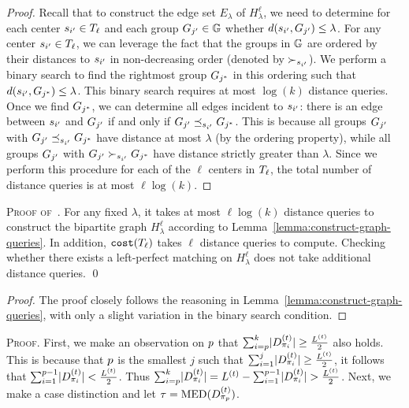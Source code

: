 \documentclass{article}
\begin{document}
\constructgraphqueries*
\begin{proof}
    Recall that to construct the edge set $E_{\lambda}$ of $H^{\ell}_{\lambda}$, we need to determine for each center $s_{i'} \in T_{\ell}$ and each group $G_{j'} \in \mathbb{G}$ whether $d(s_{i'}, G_{j'}) \leq \lambda$.
    For any center $s_{i'} \in T_{\ell}$, we can leverage the fact that the groups in $\mathbb{G}$ are ordered by their distances to $s_{i'}$ in non-decreasing order (denoted by $\succ_{s_{i'}}$). 
    We perform a binary search to find the rightmost group $G_{j^*}$ in this ordering such that $d(s_{i'}, G_{j^*}) \leq \lambda$.
    This binary search requires at most $\log(k)$ distance queries.
    Once we find $G_{j^*}$, we can determine all edges incident to $s_{i'}$: there is an edge between $s_{i'}$ and $G_{j'}$ if and only if $G_{j'} \preceq_{s_{i'}} G_{j^*}$.
    This is because all groups $G_{j'}$ with $G_{j'} \preceq_{s_{i'}} G_{j^*}$ have distance at most $\lambda$ (by the ordering property), while all groups $G_{j'}$ with $G_{j'} \succ_{s_{i'}} G_{j^*}$ have distance strictly greater than $\lambda$.
    Since we perform this procedure for each of the $\ell$ centers in $T_{\ell}$, the total number of distance queries is at most $\ell \log(k)$.
\end{proof}

\evaluatepredicatequeries*
\textsc{Proof of~.}
   For any fixed $\lambda$, it takes at most $\ell \log(k)$ distance queries to construct the bipartite graph $H^{\ell}_{\lambda}$ according to Lemma~\ref{lemma:construct-graph-queries}.
    In addition, $\texttt{cost}(T_{\ell})$ takes $\ell$ distance queries to compute.
    Checking whether there exists a left-perfect matching on $H^{\ell}_{\lambda}$ does not take additional distance queries. 
\hfill\qed


\reducesearchspace*
\begin{proof}
    The proof closely follows the reasoning in Lemma~\ref{lemma:construct-graph-queries}, with only a slight variation in the binary search condition.  
\end{proof}

\medianmedian* 
\textsc{Proof.}
First, we make an observation on $p$ that $\sum_{i=p}^{k} \lvert D_{\pi_{i}}^{(t)} \rvert  \geq \frac{L^{(t)}}{2}$ also holds. 
This is because that $p$ is the smallest $j$ such that $\sum_{i=1}^{j} \lvert D_{\pi_{i}}^{(t)} \rvert  \geq \frac{L^{(t)}}{2}$, it follows that $\sum_{i=1}^{p-1} \lvert D_{\pi_{i}}^{(t)} \rvert  < \frac{L^{(t)}}{2}$.
Thus $\sum_{i=p}^{k} \lvert D_{\pi_{i}}^{(t)} \rvert  = L^{(t)} - \sum_{i=1}^{p-1} \lvert D_{\pi_{i}}^{(t)} \rvert  > \frac{L^{(t)}}{2}$.
Next, we make a case distinction and let $\tau = \operatorname{MED}(D_{\pi_{p}}^{(t)})$. 
\end{document}
